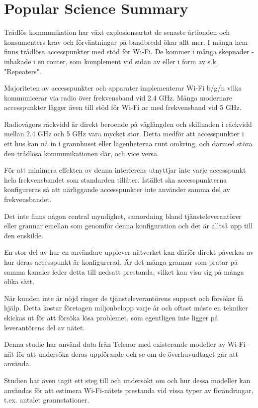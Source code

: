 
\chapter*{Popular Science Summary}

Trådlös kommunikation har växt explosionsartat de senaste årtionden och
konsumenters krav och förväntningar på bandbredd ökar allt mer. I många hem
finns trådlösa accesspunkter med stöd för Wi-Fi. De kommer i många skepnader
- inbakade i en router, som komplement vid sidan av eller i form av s.k.
"Repeaters".

Majoriteten av accesspunkter och apparater implementerar Wi-Fi b/g/n vilka kommunicerar via
radio över frekvensband vid 2.4 GHz. Många modernare accesspunkter lägger även
till stöd för Wi-Fi ac med frekvensband vid 5 GHz.

Radiovågors räckvidd är direkt beroende på våglängden och skillnaden i räckvidd
mellan 2.4 GHz och 5 GHz vara mycket stor. Detta medför att accesspunkter i
ett hus kan nå in i grannhuset eller lägenheterna runt omkring, och därmed störa
den trådlösa kommunikationen där, och vice versa.

För att minimera effekten av denna interferens utnyttjar inte varje accesspunkt
hela frekvensbandet som standarden tillåter. Istället ska accesspunkterna
konfigureras så att närliggande accesspunkter inte använder samma del av
frekvensbandet.

Det inte finns någon central myndighet, samordning bland tjänsteleverantörer
eller grannar emellan som genomför denna konfiguration och det är alltså upp
till den enskilde.

En stor del av hur en användare upplever nätverket kan därför direkt påverkas av
hur deras accesspunkt är konfigurerad. Är det många grannar som pratar på samma
kanaler leder detta till nedsatt prestanda, vilket kan visa sig på många olika
sätt.

När kunden inte är nöjd ringer de tjänsteleverantörens support och försöker få
hjälp. Detta kostar företagen miljonbelopp varje år och oftast måste en tekniker
skickas ut för att försöka lösa problemet, som egentligen inte ligger på
leverantörens del av nätet.

Denna studie har använd data från Telenor med existerande modeller av Wi-Fi-nät
för att undersöka deras uppförande och se om de överhuvudtaget går att använda.

Studien har även tagit ett steg till och undersökt om och hur dessa modeller kan
användas för att estimera Wi-Fi-nätets prestanda vid vissa typer av
förändringar, t.ex. antalet grannstationer.
